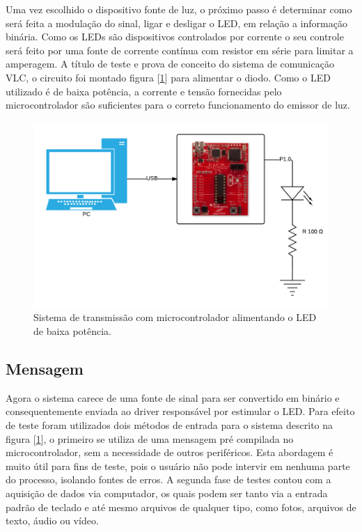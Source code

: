 Uma vez escolhido o dispositivo fonte de luz, o próximo passo é determinar como será feita a modulação do sinal, ligar e desligar o LED, em relação a informação binária. Como os LEDs são dispositivos controlados por corrente o seu controle será feito por uma fonte de corrente contínua com resistor em série para limitar a amperagem. 
A título de teste e prova de conceito do sistema de comunicação VLC, o circuito foi montado figura [\ref{Fig: sistema-transmissao}] para alimentar o diodo. Como o LED utilizado é de baixa potência, a corrente e tensão fornecidas pelo microcontrolador são suficientes para o correto funcionamento do emissor de luz.

\begin{figure}
	\centering
		\includegraphics[width = 12cm]{figuras/sistema-transmissao}
	\caption{Sistema de transmissão com microcontrolador alimentando o LED de baixa potência.}
	\label{Fig: sistema-transmissao}
\end{figure}

\subsection{Mensagem}

Agora o sistema carece de uma fonte de sinal para ser convertido em binário e 
consequentemente enviada ao driver responsável por estimular o LED.
Para efeito de teste foram utilizados dois métodos de entrada para o sistema descrito na 
figura [\ref{Fig: sistema-transmissao}], o primeiro se utiliza de uma mensagem 
pré compilada no microcontrolador, sem a necessidade de outros periféricos. Esta abordagem 
é muito útil para fins de teste, pois o usuário não pode intervir em nenhuma parte do 
processo, isolando fontes de erros.
A segunda fase de testes contou com a aquisição de dados via computador, os quais podem 
ser tanto via a entrada padrão de teclado e até mesmo arquivos de qualquer tipo, como fotos, arquivos de texto, áudio ou vídeo. 

